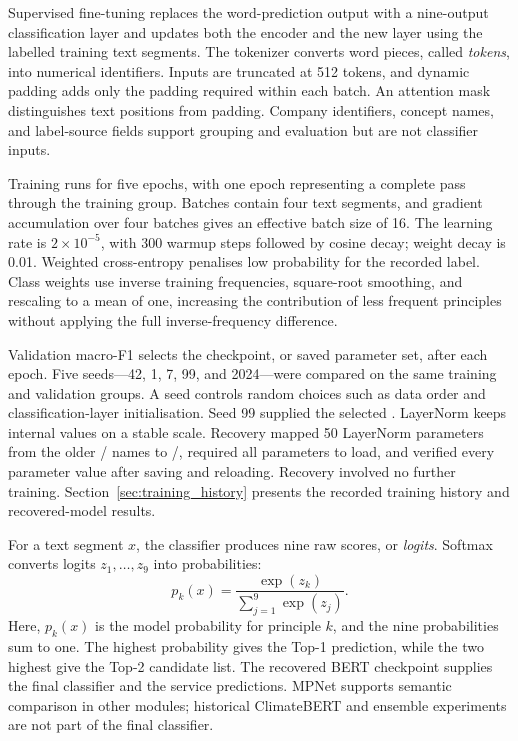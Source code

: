 Supervised fine-tuning replaces the word-prediction output with a nine-output classification layer and updates both the encoder and the new layer using the labelled training text segments. The tokenizer converts word pieces, called \emph{tokens}, into numerical identifiers. Inputs are truncated at 512 tokens, and dynamic padding adds only the padding required within each batch. An attention mask distinguishes text positions from padding. Company identifiers, concept names, and label-source fields support grouping and evaluation but are not classifier inputs.

Training runs for five epochs, with one epoch representing a complete pass through the training group. Batches contain four text segments, and gradient accumulation over four batches gives an effective batch size of 16. The learning rate is $2\times10^{-5}$, with 300 warmup steps followed by cosine decay; weight decay is 0.01. Weighted cross-entropy penalises low probability for the recorded label. Class weights use inverse training frequencies, square-root smoothing, and rescaling to a mean of one, increasing the contribution of less frequent principles without applying the full inverse-frequency difference.

Validation macro-F1 selects the checkpoint, or saved parameter set, after each epoch. Five seeds---42, 1, 7, 99, and 2024---were compared on the same training and validation groups. A seed controls random choices such as data order and classification-layer initialisation. Seed 99 supplied the selected . LayerNorm keeps internal values on a stable scale. Recovery mapped 50 LayerNorm parameters from the older / names to /, required all parameters to load, and verified every parameter value after saving and reloading. Recovery involved no further training. Section~\ref{sec:training_history} presents the recorded training history and recovered-model results.

For a text segment $x$, the classifier produces nine raw scores, or \emph{logits}. Softmax converts logits $z_1,\dots,z_9$ into probabilities:
\begin{equation}
p_k(x)=\frac{\exp(z_k)}{\sum_{j=1}^{9}\exp(z_j)}.
\label{eq:softmax}
\end{equation}
Here, $p_k(x)$ is the model probability for principle $k$, and the nine probabilities sum to one. The highest probability gives the Top-1 prediction, while the two highest give the Top-2 candidate list. The recovered BERT checkpoint supplies the final classifier and the service predictions. MPNet supports semantic comparison in other modules; historical ClimateBERT and ensemble experiments are not part of the final classifier.


